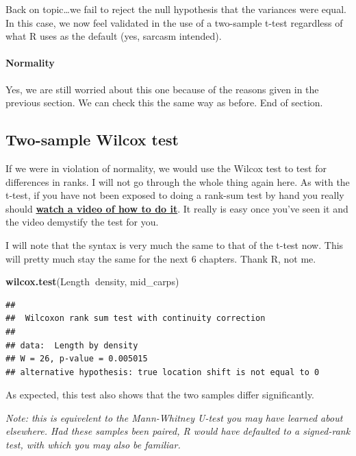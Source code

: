 \documentclass[
]{book}
\newenvironment{Shaded}{\begin{snugshade}}{\end{snugshade}}
\newcommand{\KeywordTok}[1]{\textcolor[rgb]{0.13,0.29,0.53}{\textbf{#1}}}
\newcommand{\NormalTok}[1]{#1}
\newcommand{\OperatorTok}[1]{\textcolor[rgb]{0.81,0.36,0.00}{\textbf{#1}}}
\begin{document}
Back on topic\ldots we fail to reject the null hypothesis that the variances were equal. In this case, we now feel validated in the use of a two-sample t-test regardless of what R uses as the default (yes, sarcasm intended).

\hypertarget{normality}{%
\paragraph{Normality}\label{normality}}

Yes, we are still worried about this one because of the reasons given in the previous section. We can check this the same way as before. End of section.

\hypertarget{two-sample-wilcox-test}{%
\subsection{Two-sample Wilcox test}\label{two-sample-wilcox-test}}

If we were in violation of normality, we would use the Wilcox test to test for differences in ranks. I will not go through the whole thing again here. As with the t-test, if you have not been exposed to doing a rank-sum test by hand you really should \href{https://www.youtube.com/watch?v=AM87jjnNt8U}{\textbf{watch a video of how to do it}}. It really is easy once you've seen it and the video demystify the test for you.

I will note that the syntax is very much the same to that of the t-test now. This will pretty much stay the same for the next 6 chapters. Thank R, not me.

\begin{Shaded}
\begin{Highlighting}[]
\KeywordTok{wilcox.test}\NormalTok{(Length}\OperatorTok{~}\NormalTok{density, mid_carps)}
\end{Highlighting}
\end{Shaded}

\begin{verbatim}
## 
## 	Wilcoxon rank sum test with continuity correction
## 
## data:  Length by density
## W = 26, p-value = 0.005015
## alternative hypothesis: true location shift is not equal to 0
\end{verbatim}

As expected, this test also shows that the two samples differ significantly.

\emph{Note: this is equivelent to the Mann-Whitney U-test you may have learned about elsewhere. Had these samples been paired, R would have defaulted to a signed-rank test, with which you may also be familiar.}
\end{document}
